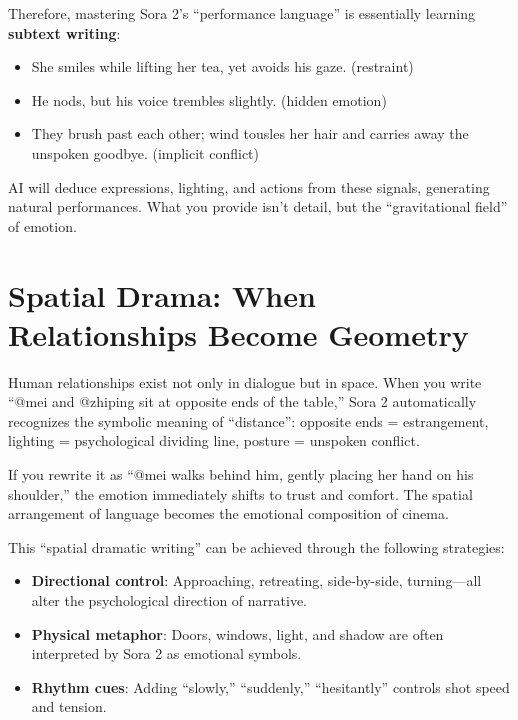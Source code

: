 Therefore, mastering Sora 2's ``performance language'' is essentially learning \textbf{subtext writing}:

\begin{itemize}
\item She smiles while lifting her tea, yet avoids his gaze. (restraint)
\item He nods, but his voice trembles slightly. (hidden emotion)
\item They brush past each other; wind tousles her hair and carries away the unspoken goodbye. (implicit conflict)
\end{itemize}

AI will deduce expressions, lighting, and actions from these signals, generating natural performances. What you provide isn't detail, but the ``gravitational field'' of emotion.

\section{Spatial Drama: When Relationships Become Geometry}
\label{sec:spatial-drama}

Human relationships exist not only in dialogue but in space. When you write ``@mei and @zhiping sit at opposite ends of the table,'' Sora 2 automatically recognizes the symbolic meaning of ``distance'': opposite ends = estrangement, lighting = psychological dividing line, posture = unspoken conflict.

If you rewrite it as ``@mei walks behind him, gently placing her hand on his shoulder,'' the emotion immediately shifts to trust and comfort. The spatial arrangement of language becomes the emotional composition of cinema.

This ``spatial dramatic writing'' can be achieved through the following strategies:

\begin{itemize}
\item \textbf{Directional control}: Approaching, retreating, side-by-side, turning—all alter the psychological direction of narrative.
\item \textbf{Physical metaphor}: Doors, windows, light, and shadow are often interpreted by Sora 2 as emotional symbols.
\item \textbf{Rhythm cues}: Adding ``slowly,'' ``suddenly,'' ``hesitantly'' controls shot speed and tension.
\end{itemize}

